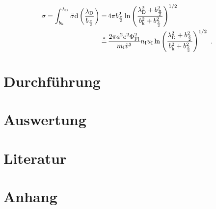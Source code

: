 \documentclass[numbers=noenddot,a4paper]{scrartcl}
\newcommand{\diff}{\textnormal{d}}
\newcommand{\ix}[1]{_\text{#1}}
\begin{document}
					\begin{align}
						\sigma=\int_{b\ix{k}}^{\lambda\ix{D}}\tilde{\sigma}\diff\left(\frac{\lambda\ix{D}}{b_{\frac{\pi}{2}}}\right)=&\,4\pi b_{\frac{\pi}{2}}^2\ln\left(\frac{\lambda\ix{D}^2+b_{\frac{\pi}{2}}^2}{b\ix{k}^2+b_{\frac{\pi}{2}}^2}\right)^{1/2} \nonumber \\
						\overset{*}{=}&\,\frac{2\pi a^2 e^2\Phi\ix{Fl}^2}{m\ix{I}\tilde{v}^3}n\ix{I}u\ix{I}\ln\left(\frac{\lambda\ix{D}^2+b_{\frac{\pi}{2}}^2}{b\ix{k}^2+b_{\frac{\pi}{2}}^2}\right)^{1/2} \, \, .
					\end{align}

	\newpage
	
	\section{Durchführung}\label{sec:durch}
	
	\newpage
	
	\section{Auswertung}\label{sec:auswert}
	
	\newpage
	
	\section{Literatur}\label{sec:lit}
	
		
		
	
	\newpage
	
	\section{Anhang}\label{sec:anhang}
	
%		
%				
	
\end{document}
